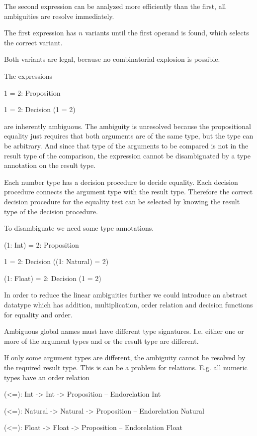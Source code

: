 The second expression can be analyzed more efficiently than the first, all
ambiguities are resolve immediately.

The first expression has $n$ variants until the first operand is found, which
selects the correct variant.

Both variants are legal, because no combinatorial explosion is possible.

The expressions

\begin{alba}
    1 = 2: Proposition

    1 = 2: Decision (1 = 2)
\end{alba}

are inherently ambiguous. The ambiguity is unresolved because the propositional
equality \code{(=)} just requires that both arguments are of the same type, but
the type can be arbitrary. And since that type of the arguments to be compared
is not in the result type of the comparison, the expression cannot be
disambiguated by a type annotation on the result type.

Each number type has a decision procedure to decide equality. Each decision
procedure connects the argument type with the result type. Therefore the correct
decision procedure for the equality test can be selected by knowing the result
type of the decision procedure.


To disambiguate we need some type annotations.

\begin{alba}
    (1: Int) = 2: Proposition

    1 = 2: Decision ((1: Natural) = 2)

    (1: Float) = 2: Decision (1 = 2)
\end{alba}


In order to reduce the linear ambiguities further we could introduce an abstract
datatype  which has addition, multiplication, order relation and
decision functions for equality and order.


Ambiguous global names must have different type signatures. I.e. either one or
more of the argument types and or the result type are different.

If only some argument types are different, the ambiguity cannot be resolved by
the required result type. This is can be a problem for relations. E.g. all
numeric types have an order relation

\begin{alba}
    (<=): Int -> Int -> Proposition             -- Endorelation Int

    (<=): Natural -> Natural -> Proposition     -- Endorelation Natural

    (<=): Float -> Float -> Proposition         -- Endorelation Float
\end{alba}

